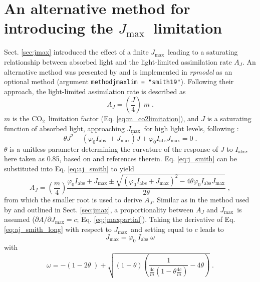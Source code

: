 \documentclass[gmd, manuscript]{copernicus}
\newcommand{\coo}{CO$_2$}
\newcommand{\jmax}{$J_{\text{max}}$}
\begin{document}
\section{An alternative method for introducing the \jmax\ limitation}
\label{sec:jmaxlim_smith}
Sect. \ref{sec:jmax} introduced the effect of a finite \jmax\, leading to a saturating relationship between absorbed light and the light-limited assimilation rate $A_J$. An alternative method was presented by \citet{smith19ecollett} and is implemented in \textit{rpmodel} as an optional method (argument \texttt{method\textunderscore jmaxlim = "smith19"}). Following their approach, the light-limited assimilation rate is described as
\begin{equation}
\label{eq:aj_smith}
    A_J = \left(\frac{J}{4} \right) \; m \;.
\end{equation}
$m$ is the \coo\ limitation factor (Eq. \ref{eq:m_co2limitation}), and $J$ is a saturating function of absorbed light, approaching \jmax\ for high light levels, following \citet{farquhar80}:
\begin{equation}
\label{eq:j_smith}
   \theta  J^2 - 
    \left(
    \varphi_0  I_{\mathrm{abs}} \; + J_{\mathrm{max}}
    \right)  J +
     \varphi_0 I_{\mathrm{abs}}  J_{\mathrm{max}} = 0 \;.  
\end{equation}
$\theta$ is a unitless parameter determining the curvature of the response of $J$ to $I_{\mathrm{abs}}$, here taken as 0.85, based on \citet{smith19ecollett} and references therein. Eq. \ref{eq:j_smith} can be substituted into Eq. \ref{eq:aj_smith} to yield
\begin{equation}
\label{eq:aj_smith_long}
    A_J = \left( \frac{m}{4} \right)
    \frac{\varphi_0 I_{\mathrm{abs}} + J_{\mathrm{max}} \pm 
    \sqrt{
    \left(\varphi_0 I_{\mathrm{abs}} + J_{\mathrm{max}} \right)^2 -
    4  \theta \varphi_0 I_{\mathrm{abs}} J_{\mathrm{max}}}}
    {2 \theta} \;,
\end{equation}
from which the smaller root is used to derive $A_J$. Similar as in the method used by \citet{wang17natpl} and outlined in Sect. \ref{sec:jmax}, a proportionality between $A_J$ and \jmax\ is assumed ($\partial A / \partial J_{\mathrm{max}} = c$; Eq. \ref{eq:jmaxpartial}). Taking the derivative of Eq. \ref{eq:aj_smith_long} with respect to \jmax\ and setting equal to $c$ leads to 
\begin{equation}
    J_{\mathrm{max}} = \varphi_0 \; I_{\mathrm{abs}} \; \omega
\end{equation}
with
\begin{equation}
    \omega = - \left(1 - 2 \theta \; \right) +
    \sqrt{\left(1 - \theta \right)
    \left(
    \frac{1}{
    \frac{4  c}{m}
    \left(1 - \theta 
    \frac{4  c}{m}\right)
    } - 4  \theta \right) }\;.
\end{equation}
\end{document}
